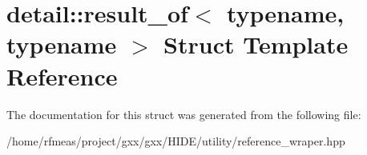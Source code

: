 \hypertarget{structdetail_1_1result__of}{}\section{detail\+:\+:result\+\_\+of$<$ typename, typename $>$ Struct Template Reference}
\label{structdetail_1_1result__of}


The documentation for this struct was generated from the following file\+:\begin{DoxyCompactItemize}
\item 
/home/rfmeas/project/gxx/gxx/\+H\+I\+D\+E/utility/reference\+\_\+wraper.\+hpp\end{DoxyCompactItemize}
